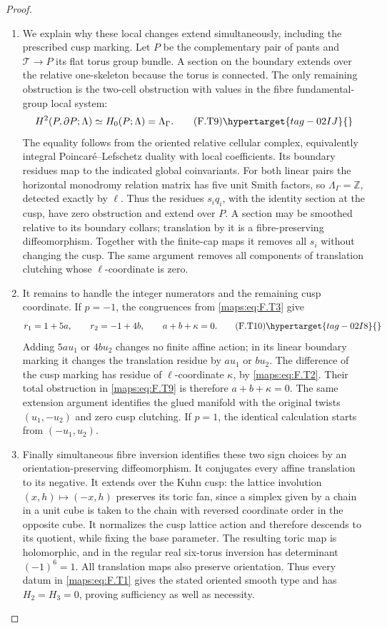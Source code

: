 \begin{proof}
\begin{enumerate}[label={$\langle1\rangle$\arabic*.}]
\item We explain why these local changes extend simultaneously,
including the prescribed cusp marking.
Let $P$ be the complementary pair of pants and
$\mathcal T\to P$ its flat torus group bundle.
A section on the boundary extends over the relative
one-skeleton because the torus is connected.
The only remaining obstruction is the two-cell obstruction
with values in the fibre fundamental-group local system:
\[
 H^2(P,\partial P;\Lambda)
        \simeq H_0(P;\Lambda)=\Lambda_\Gamma.
 \tag{F.T9}\hypertarget{tag-02IJ}{}\label{maps:eq:F.T9}
\]
The equality follows from the oriented relative cellular
complex, equivalently integral Poincar\'e--Lefschetz duality
with local coefficients.  Its boundary residues map to
the indicated global coinvariants.
For both linear pairs the horizontal monodromy relation
matrix has five unit Smith factors, so
$\Lambda_\Gamma=\mathbb Z$, detected exactly by $\ell$.
Thus the residues $s_iq_i$, with the identity section at the
cusp, have zero obstruction and extend over $P$.
A section may be smoothed relative to its boundary collars;
translation by it is a fibre-preserving diffeomorphism.
Together with the finite-cap maps it removes all $s_i$
without changing the cusp.
The same argument removes all components of translation
clutching whose $\ell$-coordinate is zero.

\item It remains to handle the integer numerators and the remaining
cusp coordinate.  If $p=-1$, the congruences from \eqref{maps:eq:F.T3}
give
\[
 r_1=1+5a,\qquad r_2=-1+4b,
 \qquad a+b+\kappa=0.
 \tag{F.T10}\hypertarget{tag-02I8}{}\label{maps:eq:F.T10}
\]
Adding $5a u_1$ or $4b u_2$ changes no finite affine action;
in its linear boundary marking it changes the translation
residue by $a u_1$ or $b u_2$.
The difference of the cusp marking has residue of
$\ell$-coordinate $\kappa$, by \eqref{maps:eq:F.T2}.
Their total obstruction in \eqref{maps:eq:F.T9} is therefore
$a+b+\kappa=0$.
The same extension argument identifies the glued manifold
with the original twists $(u_1,-u_2)$ and zero cusp
clutching.
If $p=1$, the identical calculation starts from
$(-u_1,u_2)$.

\item Finally simultaneous fibre inversion identifies these two
sign choices by an orientation-preserving diffeomorphism.
It conjugates every affine translation to its negative.
It extends over the Kuhn cusp: the lattice involution
$(x,h)\mapsto(-x,h)$ preserves its toric fan, since a
simplex given by a chain in a unit cube is taken to the
chain with reversed coordinate order in the opposite cube.
It normalizes the cusp lattice action and therefore descends
to its quotient, while fixing the base parameter.  The resulting toric map is holomorphic,
and in the regular real six-torus inversion has determinant
$(-1)^6=1$.  All translation maps also preserve orientation.
Thus every datum in \eqref{maps:eq:F.T1} gives the stated oriented smooth
type and has $H_2=H_3=0$, proving sufficiency as well as
necessity.

\end{enumerate}
\end{proof}
